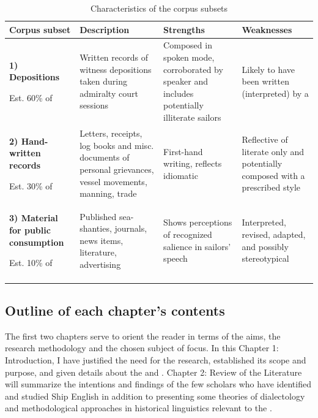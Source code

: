 \begin{table}
\caption{\label{tab:key:1.2}Characteristics of the corpus subsets}
\begin{tabularx}{\textwidth}{QQQQ}
\lsptoprule

\textbf{Corpus subset} & \textbf{Description} & \textbf{Strengths} & \textbf{Weaknesses}\\
\midrule 
\textbf{1) Depositions}

Est. 60\% of  & Written records of witness depositions taken during admiralty court sessions & Composed in spoken mode, corroborated by speaker and includes potentially illiterate sailors & Likely to have been written (interpreted) by a \\

\tablevspace
\textbf{2) Hand-written records}

Est. 30\% of  & Letters, receipts, log books and misc. documents of personal grievances, vessel movements, manning, trade & First-hand writing, reflects idiomatic  & Reflective of literate  only and potentially composed with a prescribed style\\

\tablevspace
\textbf{3) Material for public consumption}

Est. 10\% of  & Published sea-shanties, journals, news items, literature, advertising & Shows perceptions of recognized salience in sailors’ speech & Interpreted, revised, adapted, and possibly stereotypical \\
\lspbottomrule
\end{tabularx}
\end{table}

\subsection{{Outline of each chapter’s contents}}\label{sec:1.3.3}



The first two chapters serve to orient the reader in terms of the aims, the research methodology and the chosen subject of focus. In this Chapter 1: Introduction, I have justified the need for the research, established its scope and purpose, and given details about the  and . Chapter 2: Review of the Literature will summarize the intentions and findings of the few scholars who have identified and studied Ship English in addition to presenting some theories of dialectology and methodological approaches in historical linguistics relevant to the . 



